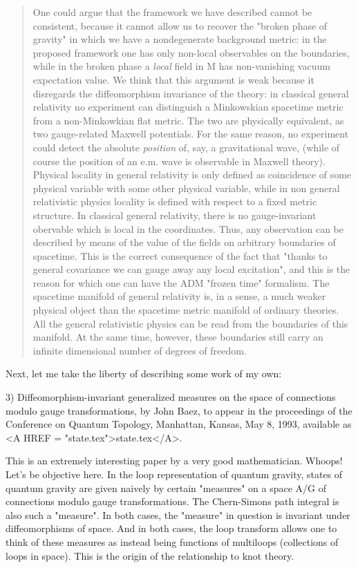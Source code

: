 \begin{quote}
One could argue that the framework we have described cannot be
consistent, because it cannot allow us to recover the "broken phase
of gravity" in which we have a nondegenerate background metric: in
the proposed framework one has only non-local observables on the
boundaries, while in the broken phase a \emph{local} field in M has
non-vanishing vacuum expectation value. We think that this argument is
weak because it disregards the diffeomorphism invariance of the theory:
in classical general relativity no experiment can distinguish a
Minkowskian spacetime metric from a non-Minkowkian flat metric.  The two
are physically equivalent, as two gauge-related Maxwell potentials.  For
the same reason, no experiment could detect the absolute \emph{position} of,
say, a gravitational wave, (while of course the position of an e.m. wave
is observable in Maxwell theory).
Physical locality in general relativity is only defined as coincidence
of some physical variable with some other physical variable, while in
non general relativistic physics locality is defined with respect to a
fixed metric structure.  In classical general relativity, there is no
gauge-invariant obervable which is local in the coordinates. Thus,
any observation can be described by means of the value of the fields
on arbitrary boundaries of spacetime. This is the correct consequence
of the fact that "thanks to general covariance we can gauge away any
local excitation", and this is the reason for which one can have the ADM
"frozen time" formalism.  The spacetime manifold of general relativity
is, in a sense, a much weaker physical object than the spacetime metric
manifold of ordinary theories.  All the general relativistic physics can
be read from the boundaries of this manifold. At the same time, however,
these boundaries still carry an infinite dimensional number of degrees
of freedom. 
\end{quote}

Next, let me take the liberty of describing some work of my own:

3)  Diffeomorphism-invariant generalized measures on the space of
connections modulo gauge transformations, by John Baez, to appear in the
proceedings of the Conference on Quantum Topology, Manhattan, Kansas, 
May 8, 1993, available as <A HREF = "state.tex">state.tex</A>.

This is an extremely interesting paper by a very good mathematician.
Whoops!   Let's be objective here.   In the loop representation of
quantum gravity, states of quantum gravity are given naively by certain
"measures" on a space A/G of connections modulo gauge transformations.  
The Chern-Simons path integral is also such a "measure".  In both cases,
the "measure" in question is invariant under diffeomorphisms of space.  
And in both cases, the loop transform allows one to think of these
measures as instead being functions of multiloops (collections of loops
in space).  This is the origin of the relationship to knot theory.  

